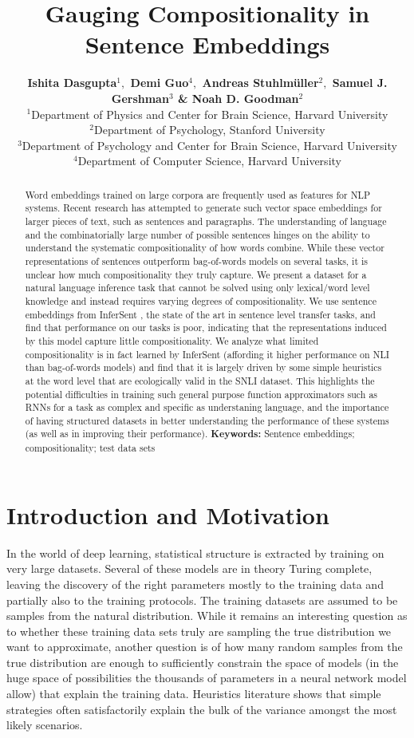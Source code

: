 \documentclass[10pt,letterpaper]{article}
\title{Gauging Compositionality in Sentence Embeddings}
\author{\textbf{Ishita Dasgupta$^1,$  Demi Guo$^4,$ Andreas Stuhlm\"uller$^2,$ Samuel J. Gershman$^3$ \& Noah D. Goodman$^2$}\medskip\\ 
$^1$Department of Physics and Center for Brain Science, Harvard University\\
$^2$Department of Psychology, Stanford University\\
$^3$Department of Psychology and Center for Brain Science, Harvard University\\
$^4$Department of Computer Science, Harvard University
}
\begin{document}
\maketitle


\begin{abstract}
Word embeddings trained on large corpora are frequently used as features for NLP systems. Recent research has attempted to generate such vector space embeddings for larger pieces of text, such as sentences and paragraphs. The understanding of language and the combinatorially large number of possible sentences hinges on the ability to understand the systematic compositionality of how words combine. While these vector representations of sentences outperform bag-of-words models on several tasks, it is unclear how much compositionality they truly capture. We present a dataset for a natural language inference task that cannot be solved using only lexical/word level knowledge and instead requires varying degrees of compositionality. We use sentence embeddings from InferSent \citep{Conneau:2017uf}, the state of the art in sentence level transfer tasks, and find that performance on our tasks is poor, indicating that the representations induced by this model capture little compositionality. We analyze what limited compositionality is in fact learned by InferSent (affording it higher performance on NLI than bag-of-words models) and find that it is largely driven by some simple heuristics at the word level that are ecologically valid in the SNLI dataset. This highlights the potential difficulties in training such general purpose function approximators such as RNNs for a task as complex and specific as understaning language, and the importance of having structured datasets in better understanding the performance of these systems (as well as in improving their performance).
\textbf{Keywords:} 
Sentence embeddings; compositionality; test data sets
\end{abstract}


\section{Introduction and Motivation}
In the world of deep learning, statistical structure is extracted by training on very large datasets. Several of these models are in theory Turing complete, leaving the discovery of the right parameters mostly to the training data and partially also to the training protocols. The training datasets are assumed to be samples from the natural distribution. While it remains an interesting question as to whether these training data sets truly are sampling the true distribution we want to approximate, another question is of how many random samples from the true distribution are enough to sufficiently constrain the space of models (in the huge space of possibilities the thousands of parameters in a neural network model allow) that explain the training data. Heuristics literature shows that simple strategies often satisfactorily explain the bulk of the variance amongst the most likely scenarios.
\end{document}
